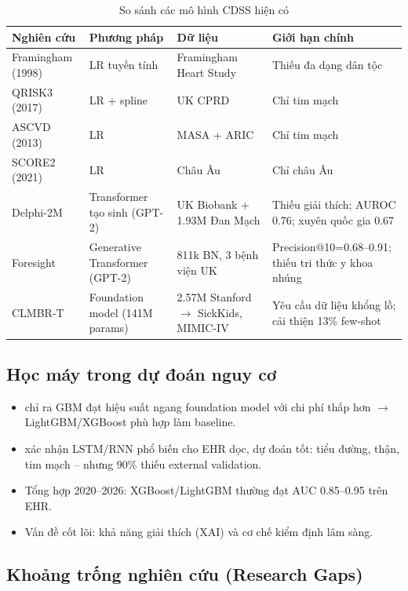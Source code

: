 \documentclass[13pt,a4paper]{article}
\begin{document}
\begin{table}[H]
\centering
\caption{So sánh các mô hình CDSS hiện có}
\label{tab:cdss_comparison}
\begin{tabular}{>{\raggedright\arraybackslash}p{2.5cm}>{\raggedright\arraybackslash}p{2.5cm}>{\raggedright\arraybackslash}p{2.5cm}>{\raggedright\arraybackslash}p{4cm}}
\toprule
Nghiên cứu & Phương pháp & Dữ liệu & Giới hạn chính \\
\midrule
Framingham (1998) & LR tuyến tính & Framingham Heart Study & Thiếu đa dạng dân tộc \\
QRISK3 (2017) & LR + spline & UK CPRD & Chỉ tim mạch \\
ASCVD (2013) & LR & MASA + ARIC & Chỉ tim mạch \\
SCORE2 (2021) & LR & Châu Âu & Chỉ châu Âu \\
Delphi-2M \cite{shmatko2025} & Transformer tạo sinh (GPT-2) & UK Biobank + 1.93M Đan Mạch & Thiếu giải thích; AUROC 0.76; xuyên quốc gia 0.67 \\
Foresight \cite{kraljevic2024} & Generative Transformer (GPT-2) & 811k BN, 3 bệnh viện UK & Precision@10=0.68--0.91; thiếu tri thức y khoa nhúng \\
CLMBR-T \cite{guo2024} & Foundation model (141M params) & 2.57M Stanford $\to$ SickKids, MIMIC-IV & Yêu cầu dữ liệu khổng lồ; cải thiện 13\% few-shot \\
\bottomrule
\end{tabular}
\end{table}

\subsection{Học máy trong dự đoán nguy cơ}

\begin{itemize}
    \item \cite{guo2024} chỉ ra GBM đạt hiệu suất ngang foundation model với chi phí thấp hơn $\to$ LightGBM/XGBoost phù hợp làm baseline.
    \item \cite{swinckels2024} xác nhận LSTM/RNN phổ biến cho EHR dọc, dự đoán tốt: tiểu đường, thận, tim mạch -- nhưng 90\% thiếu external validation.
    \item Tổng hợp 2020--2026: XGBoost/LightGBM thường đạt AUC 0.85--0.95 trên EHR.
    \item Vấn đề cốt lõi: khả năng giải thích (XAI) và cơ chế kiểm định lâm sàng.
\end{itemize}

\subsection{Khoảng trống nghiên cứu (Research Gaps)}
\end{document}
